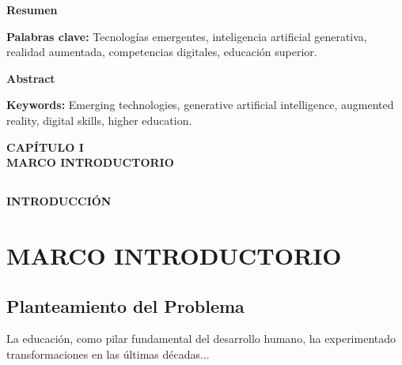 \documentclass[11pt,oneside,letterpaper]{book}
\begin{document}
\newpage
{}
\vspace*{\fill}
\begin{center}
	\textbf{Resumen}
\end{center}
\lipsum[1]
\vspace{1em}
\textbf{Palabras clave:} Tecnologías emergentes, inteligencia artificial generativa, realidad aumentada, competencias digitales, educación superior.
\vspace*{\fill}

\newpage
\vspace*{\fill}
\begin{center}
	\textbf{Abstract}
\end{center}
\lipsum[1]
\vspace{1em}
\textbf{Keywords:} Emerging technologies, generative artificial intelligence, augmented reality, digital skills, higher education.
\vspace*{\fill}

\newpage
{}
\thispagestyle{empty}
\vspace*{0.35\textheight}
\begin{center}
	{\Huge\textbf{CAPÍTULO I}} \\[0.5cm]
	{\Huge\textbf{MARCO INTRODUCTORIO}}
\end{center}
\newpage
\thispagestyle{fancy}

\section*{}
\begin{center}
	\Large \textbf{INTRODUCCIÓN}
\end{center}

\chapter{MARCO INTRODUCTORIO}
\thispagestyle{fancy}

\section{Planteamiento del Problema}
La educación, como pilar fundamental del desarrollo humano, ha experimentado transformaciones en las últimas décadas...
\end{document}
